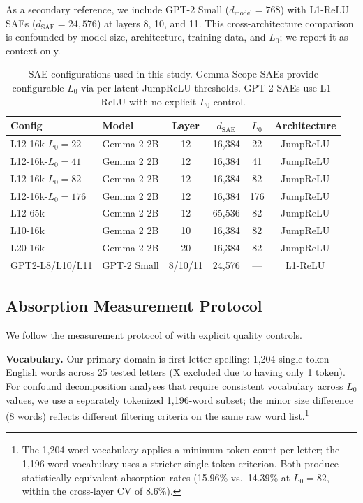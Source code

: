 \documentclass{article}
\begin{document}
As a secondary reference, we include GPT-2 Small ($d_{\text{model}} = 768$) with L1-ReLU SAEs ($d_{\text{SAE}} = 24{,}576$) at layers 8, 10, and 11. This cross-architecture comparison is confounded by model size, architecture, training data, and $L_0$; we report it as context only.

\begin{table}[t]
\caption{SAE configurations used in this study. Gemma Scope SAEs provide configurable $L_0$ via per-latent JumpReLU thresholds. GPT-2 SAEs use L1-ReLU with no explicit $L_0$ control.}
\label{tab:configs}
\centering
\small
\begin{tabular}{llcccc}
\toprule
Config & Model & Layer & $d_{\text{SAE}}$ & $L_0$ & Architecture \\
\midrule
L12-16k-$L_0{=}22$ & Gemma 2 2B & 12 & 16,384 & 22 & JumpReLU \\
L12-16k-$L_0{=}41$ & Gemma 2 2B & 12 & 16,384 & 41 & JumpReLU \\
L12-16k-$L_0{=}82$ & Gemma 2 2B & 12 & 16,384 & 82 & JumpReLU \\
L12-16k-$L_0{=}176$ & Gemma 2 2B & 12 & 16,384 & 176 & JumpReLU \\
L12-65k & Gemma 2 2B & 12 & 65,536 & 82 & JumpReLU \\
L10-16k & Gemma 2 2B & 10 & 16,384 & 82 & JumpReLU \\
L20-16k & Gemma 2 2B & 20 & 16,384 & 82 & JumpReLU \\
GPT2-L8/L10/L11 & GPT-2 Small & 8/10/11 & 24,576 & --- & L1-ReLU \\
\bottomrule
\end{tabular}
\end{table}

\subsection{Absorption Measurement Protocol}

We follow the measurement protocol of \citet{chanin2024absorption} with explicit quality controls.

\textbf{Vocabulary.} Our primary domain is first-letter spelling: 1,204 single-token English words across 25 tested letters (X excluded due to having only 1 token). For confound decomposition analyses that require consistent vocabulary across $L_0$ values, we use a separately tokenized 1,196-word subset; the minor size difference (8 words) reflects different filtering criteria on the same raw word list.\footnote{The 1,204-word vocabulary applies a minimum token count per letter; the 1,196-word vocabulary uses a stricter single-token criterion. Both produce statistically equivalent absorption rates (15.96\% vs.\ 14.39\% at $L_0 = 82$, within the cross-layer CV of 8.6\%).}
\end{document}
